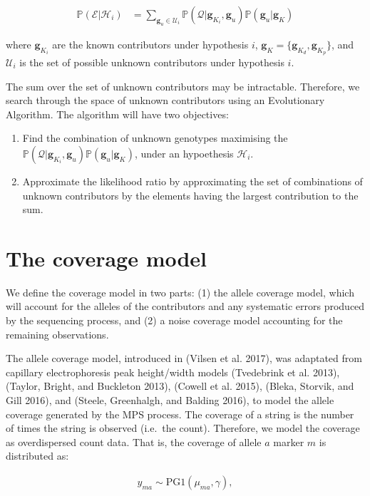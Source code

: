 \documentclass[]{article}
\newcommand{\bs}[1]{\ensuremath{\boldsymbol{#1}}}
\newcommand{\mc}[1]{\ensuremath{\mathcal{#1}}}
\newcommand{\mcg}{\ensuremath{g}}
\newcommand{\p}[1]{\ensuremath{\mathbb{P}\left(#1\right)}}
\begin{document}
\begin{align*}
\p{\mc E|\mc H_i} &= \sum_{\bs \mcg_{u} \in \mc U_i} \p{\bs{\mc Q}|\bs \mcg_{K_i}, \bs \mcg_{u}}\p{\bs \mcg_{u}|\bs \mcg_{K}}
\end{align*}

where \(\bs \mcg_{K_i}\) are the known contributors under hypothesis
\(i\), \(\bs \mcg_{K} = \{\bs \mcg_{K_d}, \bs \mcg_{K_p}\}\), and
\(\mc U_i\) is the set of possible unknown contributors under hypothesis
\(i\).

The sum over the set of unknown contributors may be intractable.
Therefore, we search through the space of unknown contributors using an
Evolutionary Algorithm. The algorithm will have two objectives:

\begin{enumerate}[(1)]
\item Find the combination of unknown genotypes maximising the $\p{\bs{\mc Q}|\bs \mcg_{K_i}, \bs \mcg_{u}}\p{\bs \mcg_{u}|\bs \mcg_{K}}$, under an hypoethesis $\mc H_i$.
\item Approximate the likelihood ratio by approximating the set of combinations of unknown contributors by the elements having the largest contribution to the sum.
\end{enumerate}

\section{The coverage model}\label{the-coverage-model}

We define the coverage model in two parts: (1) the allele coverage
model, which will account for the alleles of the contributors and any
systematic errors produced by the sequencing process, and (2) a noise
coverage model accounting for the remaining observations.

The allele coverage model, introduced in (Vilsen et al. 2017), was
adaptated from capillary electrophoresis peak height/width models
(Tvedebrink et al. 2013), (Taylor, Bright, and Buckleton 2013), (Cowell
et al. 2015), (Bleka, Storvik, and Gill 2016), and (Steele, Greenhalgh,
and Balding 2016), to model the allele coverage generated by the MPS
process. The coverage of a string is the number of times the string is
observed (i.e.~the count). Therefore, we model the coverage as
overdispersed count data. That is, the coverage of allele \(a\) marker
\(m\) is distributed as:

\begin{align*}
y_{ma} \sim \text{PG1}\left(\mu_{ma}, \gamma\right),
\end{align*}
\end{document}
